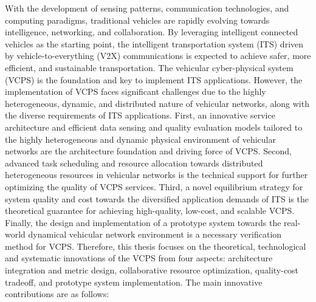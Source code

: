 \begin{eabstract}	%

With the development of sensing patterns, communication technologies, and computing paradigms, traditional vehicles are rapidly evolving towards intelligence, networking, and collaboration. By leveraging intelligent connected vehicles as the starting point, the intelligent transportation system (ITS) driven by vehicle-to-everything (V2X) communications is expected to achieve safer, more efficient, and sustainable transportation. The vehicular cyber-physical system (VCPS) is the foundation and key to implement ITS applications. However, the implementation of VCPS faces significant challenges due to the highly heterogeneous, dynamic, and distributed nature of vehicular networks, along with the diverse requirements of ITS applications. First, an innovative service architecture and efficient data sensing and quality evaluation models tailored to the highly heterogeneous and dynamic physical environment of vehicular networks are the architecture foundation and driving force of VCPS. Second, advanced task scheduling and resource allocation towards distributed heterogeneous resources in vehicular networks is the technical support for further optimizing the quality of VCPS services. Third, a novel equilibrium strategy for system quality and cost towards the diversified application demands of ITS is the theoretical guarantee for achieving high-quality, low-cost, and scalable VCPS. Finally, the design and implementation of a prototype system towards the real-world dynamical vehicular network environment is a necessary verification method for VCPS. Therefore, this thesis focuses on the theoretical, technological and systematic innovations of the VCPS from four aspects: architecture integration and metric design, collaborative resource optimization, quality-cost tradeoff, and prototype system implementation. The main innovative contributions are as follows:


\end{eabstract}
